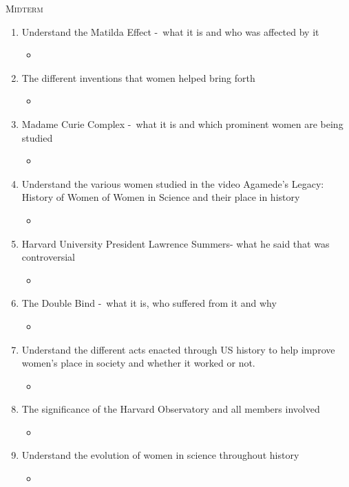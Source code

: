 \documentclass[12pt,a4paper]{article}
\begin{document}
  \begin{center}
    \textsc{\LARGE Midterm}
  \end{center}
  \begin{enumerate}
    \item Understand the Matilda Effect -\ what it is and who was affected by it
    \begin{itemize}
      \item 
    \end{itemize}
    \item The different inventions that women helped bring forth
    \begin{itemize}
      \item 
    \end{itemize}
    \item Madame Curie Complex -\ what it is and which prominent women are being studied
    \begin{itemize}
      \item 
    \end{itemize}
    \item Understand the various women studied in the video Agamede’s Legacy: History of Women of Women in Science and their place in history
    \begin{itemize}
      \item 
    \end{itemize}
    \item Harvard University President Lawrence Summers- what he said that was controversial
    \begin{itemize}
      \item 
    \end{itemize}
    \item The Double Bind -\ what it is, who suffered from it and why
    \begin{itemize}
      \item 
    \end{itemize}
    \item Understand the different acts enacted through US history to help improve women’s place in society and whether it worked or not.
    \begin{itemize}
      \item 
    \end{itemize}
    \item The significance of the Harvard Observatory and all members involved
    \begin{itemize}
      \item 
    \end{itemize}
    \item Understand the evolution of women in science throughout history
    \begin{itemize}
      \item 
    \end{itemize}
  \end{enumerate}
\end{document}

